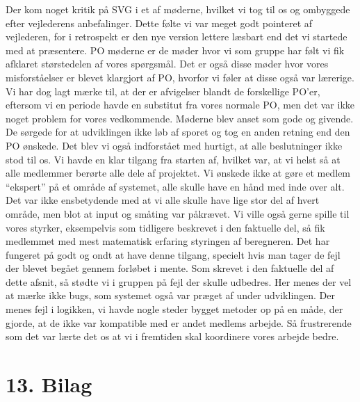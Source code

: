\documentclass[11pt]{report}
\begin{document}
Der kom noget kritik på SVG i et af møderne, hvilket vi tog til os og ombyggede efter vejlederens anbefalinger. Dette følte vi var meget godt pointeret af vejlederen, for i retrospekt er den nye version lettere læsbart end det vi startede med at præsentere.
PO møderne er de møder hvor vi som gruppe har følt vi fik afklaret størstedelen af vores spørgsmål. Det er også disse møder hvor vores misforståelser er blevet klargjort af PO, hvorfor vi føler at disse også var lærerige. Vi har dog lagt mærke til, at der er afvigelser blandt de forskellige PO’er, eftersom vi en periode havde en substitut fra vores normale PO, men det var ikke noget problem for vores vedkommende. Møderne blev anset som gode og givende. De sørgede for at udviklingen ikke løb af sporet og tog en anden retning end den PO ønskede. Det blev vi også indforstået med hurtigt, at alle beslutninger ikke stod til os.
Vi havde en klar tilgang fra starten af, hvilket var, at vi helst så at alle medlemmer berørte alle dele af projektet. Vi ønskede ikke at gøre et medlem “ekspert” på et område af systemet, alle skulle have en hånd med inde over alt. Det var ikke ensbetydende med at vi alle skulle have lige stor del af hvert område, men blot at input og småting var påkrævet. Vi ville også gerne spille til vores styrker, eksempelvis som tidligere beskrevet i den faktuelle del, så fik medlemmet med mest matematisk erfaring styringen af beregneren. 
Det har fungeret på godt og ondt at have denne tilgang, specielt hvis man tager de fejl der blevet begået gennem forløbet i mente.
Som skrevet i den faktuelle del af dette afsnit, så stødte vi i gruppen på fejl der skulle udbedres. Her menes der vel at mærke ikke bugs, som systemet også var præget af under udviklingen. Der menes fejl i logikken, vi havde nogle steder bygget metoder op på en måde, der gjorde, at de ikke var kompatible med er andet medlems arbejde. Så frustrerende som det var lærte det os at vi i fremtiden skal koordinere vores arbejde bedre.

\begingroup
\renewcommand{\cleardoublepage}{}
\renewcommand{\clearpage}{}
\newpage
\chapter*{13. Bilag}
\endgroup
\noindent
\end{document}
